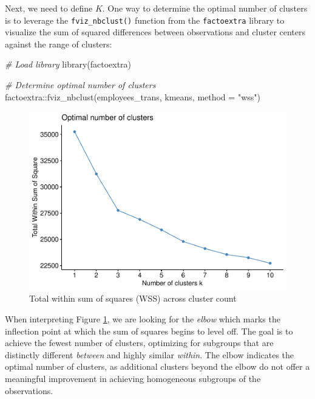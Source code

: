 \documentclass[
]{book}
\newenvironment{Shaded}{\begin{snugshade}}{\end{snugshade}}
\newcommand{\AttributeTok}[1]{\textcolor[rgb]{0.77,0.63,0.00}{#1}}
\newcommand{\CommentTok}[1]{\textcolor[rgb]{0.56,0.35,0.01}{\textit{#1}}}
\newcommand{\FunctionTok}[1]{\textcolor[rgb]{0.00,0.00,0.00}{#1}}
\newcommand{\NormalTok}[1]{#1}
\newcommand{\SpecialCharTok}[1]{\textcolor[rgb]{0.00,0.00,0.00}{#1}}
\newcommand{\StringTok}[1]{\textcolor[rgb]{0.31,0.60,0.02}{#1}}
\begin{document}
Next, we need to define \(K\). One way to determine the optimal number of clusters is to leverage the \texttt{fviz\_nbclust()} function from the \texttt{factoextra} library to visualize the sum of squared differences between observations and cluster centers against the range of clusters:

\begin{Shaded}
\begin{Highlighting}[]
\CommentTok{\# Load library}
\FunctionTok{library}\NormalTok{(factoextra)}

\CommentTok{\# Determine optimal number of clusters}
\NormalTok{factoextra}\SpecialCharTok{::}\FunctionTok{fviz\_nbclust}\NormalTok{(employees\_trans, kmeans, }\AttributeTok{method =} \StringTok{"wss"}\NormalTok{)}
\end{Highlighting}
\end{Shaded}

\begin{figure}

{\centering \includegraphics[width=1\linewidth]{The_Fundamentals_of_People_Analytics_files/figure-latex/kmeans-elbow-plot-1} 

}

\caption{Total within sum of squares (WSS) across cluster count}\label{fig:kmeans-elbow-plot}
\end{figure}

When interpreting Figure \ref{fig:kmeans-elbow-plot}, we are looking for the \emph{elbow} which marks the inflection point at which the sum of squares begins to level off. The goal is to achieve the fewest number of clusters, optimizing for subgroups that are distinctly different \emph{between} and highly similar \emph{within}. The elbow indicates the optimal number of clusters, as additional clusters beyond the elbow do not offer a meaningful improvement in achieving homogeneous subgroups of the observations.
\end{document}
